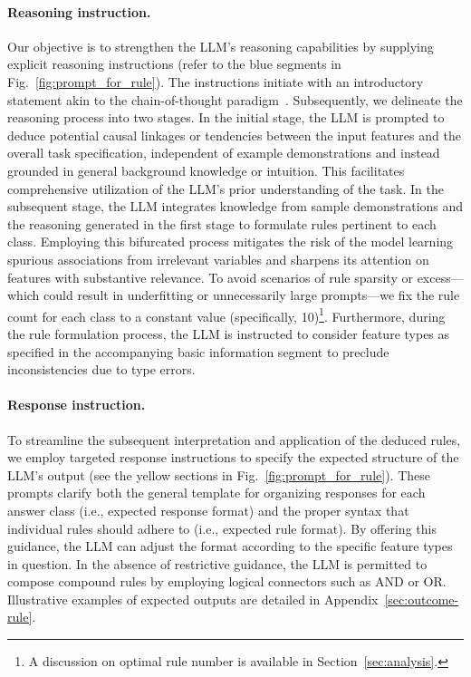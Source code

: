 \paragraph{Reasoning instruction.} Our objective is to strengthen the LLM's reasoning capabilities by supplying explicit reasoning instructions (refer to the blue segments in Fig.~\ref{fig:prompt_for_rule}). The instructions initiate with an introductory statement akin to the chain-of-thought paradigm~\cite{wei2022chain}. Subsequently, we delineate the reasoning process into two stages. In the initial stage, the LLM is prompted to deduce potential causal linkages or tendencies between the input features and the overall task specification, independent of example demonstrations and instead grounded in general background knowledge or intuition. This facilitates comprehensive utilization of the LLM’s prior understanding of the task. In the subsequent stage, the LLM integrates knowledge from sample demonstrations and the reasoning generated in the first stage to formulate rules pertinent to each class. Employing this bifurcated process mitigates the risk of the model learning spurious associations from irrelevant variables and sharpens its attention on features with substantive relevance. To avoid scenarios of rule sparsity or excess—which could result in underfitting or unnecessarily large prompts—we fix the rule count for each class to a constant value (specifically, 10)\footnote{A discussion on optimal rule number is available in Section~\ref{sec:analysis}.}. Furthermore, during the rule formulation process, the LLM is instructed to consider feature types as specified in the accompanying basic information segment to preclude inconsistencies due to type errors.

\vspace*{-0.12in}
\paragraph{Response instruction.} To streamline the subsequent interpretation and application of the deduced rules, we employ targeted response instructions to specify the expected structure of the LLM’s output (see the yellow sections in Fig.~\ref{fig:prompt_for_rule}). These prompts clarify both the general template for organizing responses for each answer class (i.e., expected response format) and the proper syntax that individual rules should adhere to (i.e., expected rule format). By offering this guidance, the LLM can adjust the format according to the specific feature types in question. In the absence of restrictive guidance, the LLM is permitted to compose compound rules by employing logical connectors such as AND or OR. Illustrative examples of expected outputs are detailed in Appendix~\ref{sec:outcome-rule}.


